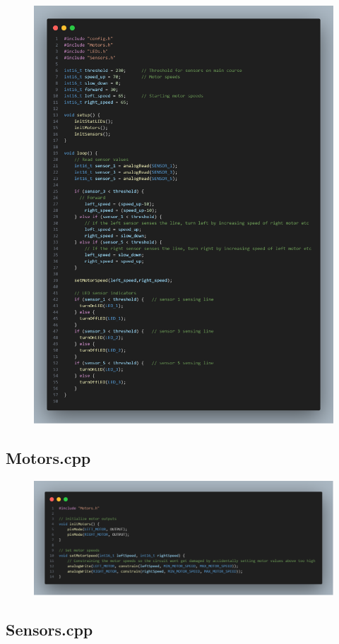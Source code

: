 \documentclass{article}
\begin{document}
\begin{figure}[H]
    \centering
    \includegraphics[width=0.8\linewidth]{REPORT/LFR_main.png}
\end{figure}

\subsection{Motors.cpp}

\begin{figure}[H]
    \centering
    \includegraphics[width=0.8\linewidth]{REPORT/Motorscode.png}
\end{figure}

\subsection{Sensors.cpp}
\end{document}
